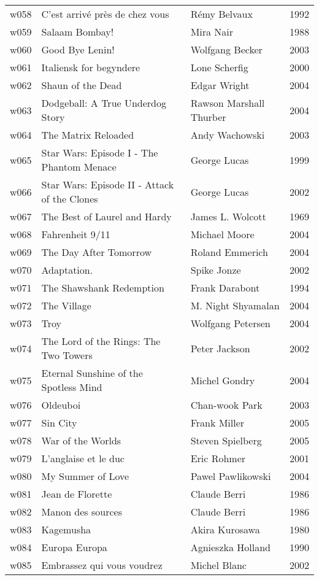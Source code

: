 \documentclass{article}
\begin{document}
\begin {center}
\begin{longtable}{l p{10cm} l l}
w058 & C'est arrivé près de chez vous & Rémy Belvaux & 1992 \\
w059 & Salaam Bombay! & Mira Nair & 1988 \\
w060 & Good Bye Lenin! & Wolfgang Becker & 2003 \\
w061 & Italiensk for begyndere & Lone Scherfig & 2000 \\
w062 & Shaun of the Dead & Edgar Wright & 2004 \\
w063 & Dodgeball: A True Underdog Story & Rawson Marshall Thurber & 2004 \\
w064 & The Matrix Reloaded & Andy Wachowski & 2003 \\
w065 & Star Wars: Episode I - The Phantom Menace & George Lucas & 1999 \\
w066 & Star Wars: Episode II - Attack of the Clones & George Lucas & 2002 \\
w067 & The Best of Laurel and Hardy & James L. Wolcott & 1969 \\
w068 & Fahrenheit 9/11 & Michael Moore & 2004 \\
w069 & The Day After Tomorrow & Roland Emmerich & 2004 \\
w070 & Adaptation. & Spike Jonze & 2002 \\
w071 & The Shawshank Redemption & Frank Darabont & 1994 \\
w072 & The Village & M. Night Shyamalan & 2004 \\
w073 & Troy & Wolfgang Petersen & 2004 \\
w074 & The Lord of the Rings: The Two Towers & Peter Jackson & 2002 \\
w075 & Eternal Sunshine of the Spotless Mind & Michel Gondry & 2004 \\
w076 & Oldeuboi & Chan-wook Park & 2003 \\
w077 & Sin City & Frank Miller & 2005 \\
w078 & War of the Worlds & Steven Spielberg & 2005 \\
w079 & L'anglaise et le duc & Eric Rohmer & 2001 \\
w080 & My Summer of Love & Pawel Pawlikowski & 2004 \\
w081 & Jean de Florette & Claude Berri & 1986 \\
w082 & Manon des sources & Claude Berri & 1986 \\
w083 & Kagemusha & Akira Kurosawa & 1980 \\
w084 & Europa Europa & Agnieszka Holland & 1990 \\
w085 & Embrassez qui vous voudrez & Michel Blanc & 2002 \\

\end{longtable}
\end{center}
\end{document}
